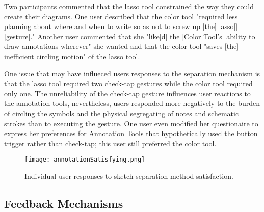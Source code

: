 \documentclass{egpubl}
\begin{document}
Two participants commented that the lasso tool constrained the way
they could create their diagrams.  One user described that
the color tool "required less planning about where and when to write
so as not to screw up [the] lasso[] [gesture]."  Another user
commented that she "like[d] the [Color Tool's] ability to draw
annotations wherever" she wanted and that the color tool "saves [the]
inefficient circling motion" of the lasso tool.  

One issue that may have influeced users responses to the separation
mechanism is that the lasso tool required two check-tap gestures while
the color tool required only one.  The unreliability of the check-tap
gesture influences user reactions to the annotation tools,
nevertheless, users responded more negatively to the burden of
circling the symbols and the physical segregating of notes and
schematic strokes than to executing the gesture.  One user even modified 
her questionaire to express her preferences for Annotation Tools that 
hypothetically used the button trigger rather than check-tap; this user 
still preferred the color tool.


\begin{figure}[tb]
  \centering
  \texttt{[image: annotationSatisfying.png]}
  \caption{\label{fig:annotationSatisfaction} Individual user
           responses to sketch separation method satisfaction.}
           
\end{figure}



\subsection{Feedback Mechanisms}
\end{document}
